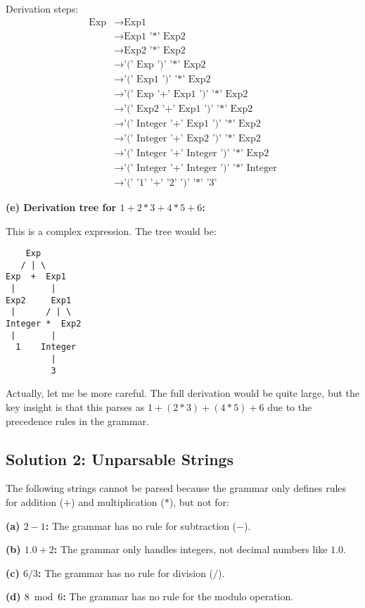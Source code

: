 \documentclass[12pt]{article}
\begin{document}
Derivation steps:
\begin{align}
\text{Exp} &\to \text{Exp1} \\
&\to \text{Exp1 '*' Exp2} \\
&\to \text{Exp2 '*' Exp2} \\
&\to \text{'(' Exp ')' '*' Exp2} \\
&\to \text{'(' Exp1 ')' '*' Exp2} \\
&\to \text{'(' Exp '+' Exp1 ')' '*' Exp2} \\
&\to \text{'(' Exp2 '+' Exp1 ')' '*' Exp2} \\
&\to \text{'(' Integer '+' Exp1 ')' '*' Exp2} \\
&\to \text{'(' Integer '+' Exp2 ')' '*' Exp2} \\
&\to \text{'(' Integer '+' Integer ')' '*' Exp2} \\
&\to \text{'(' Integer '+' Integer ')' '*' Integer} \\
&\to \text{'(' '1' '+' '2' ')' '*' '3'}
\end{align}

\textbf{(e) Derivation tree for $1+2*3+4*5+6$:}

This is a complex expression. The tree would be:

\begin{verbatim}
    Exp
   / | \
Exp  +  Exp1
 |       |
Exp2     Exp1
 |      / | \
Integer *  Exp2
 |       |
  1    Integer
         |
         3
\end{verbatim}

Actually, let me be more careful. The full derivation would be quite large, but the key insight is that this parses as $1 + (2*3) + (4*5) + 6$ due to the precedence rules in the grammar.

\subsection*{Solution 2: Unparsable Strings}

The following strings cannot be parsed because the grammar only defines rules for addition ($+$) and multiplication ($*$), but not for:

\textbf{(a) $2-1$:} The grammar has no rule for subtraction ($-$).

\textbf{(b) $1.0+2$:} The grammar only handles integers, not decimal numbers like $1.0$.

\textbf{(c) $6/3$:} The grammar has no rule for division ($/$).

\textbf{(d) $8 \bmod 6$:} The grammar has no rule for the modulo operation.
\end{document}
